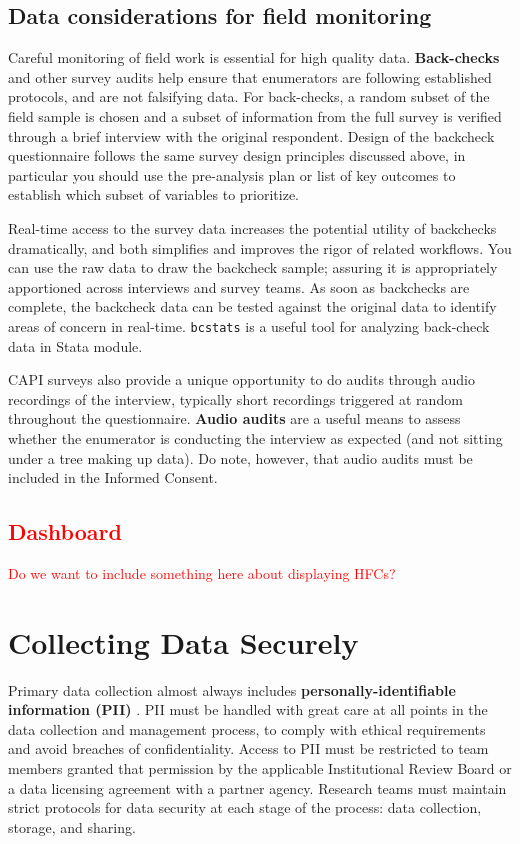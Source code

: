 {\subsection{Data considerations for field monitoring}
Careful monitoring of field work is essential for high quality data.  
\textbf{Back-checks} and other survey audits help ensure that enumerators are following established protocols, and are not falsifying data. 
For back-checks, a random subset of the field sample is chosen and a subset of information from the full survey is verified through a brief interview with the original respondent. 
Design of the backcheck questionnaire follows the same survey design principles discussed above, in particular you should use the pre-analysis plan or list of key outcomes to establish which subset of variables to prioritize. 

Real-time access to the survey data increases the potential utility of backchecks dramatically, and both simplifies and improves the rigor of related workflows. 
You can use the raw data to draw the backcheck sample; assuring it is appropriately apportioned across interviews and survey teams. 
As soon as backchecks are complete, the backcheck data can be tested against the original data to identify areas of concern in real-time. 
\texttt{bcstats} is a useful tool for analyzing back-check data in Stata module. 

CAPI surveys also provide a unique opportunity to do audits through audio recordings of the interview, typically short recordings triggered at random throughout the questionnaire. 
\textbf{Audio audits} are a useful means to assess whether the enumerator is conducting the interview as expected (and not sitting under a tree making up data). 
Do note, however, that audio audits must be included in the Informed Consent. 

\textcolor{red}{
\subsection{Dashboard}
Do we want to include something here about displaying HFCs? }


\section{Collecting Data Securely}
Primary data collection almost always includes  \textbf{personally-identifiable information (PII)} 
. 
PII must be handled with great care at all points in the data collection and management process, to comply with ethical requirements and avoid breaches of confidentiality. Access to PII must be restricted to team members granted that permission by the applicable Institutional Review Board or a data licensing agreement with a partner agency. Research teams must maintain strict protocols for data security at each stage of the process: data collection, storage, and sharing. 

}
